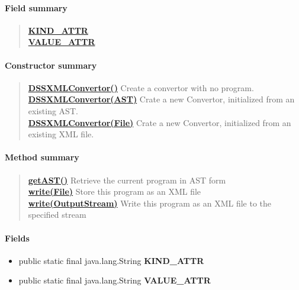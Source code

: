 {{{{\paragraph{Field summary}{
\begin{verse}
\hyperlink{org.openmrs.module.dssmodule.DSSXMLConvertor.KIND_ATTR}{{\bf KIND\_ATTR}} \\
\hyperlink{org.openmrs.module.dssmodule.DSSXMLConvertor.VALUE_ATTR}{{\bf VALUE\_ATTR}} \\
\end{verse}
}
\paragraph{Constructor summary}{
\begin{verse}
\hyperlink{org.openmrs.module.dssmodule.DSSXMLConvertor()}{{\bf DSSXMLConvertor()}} Create a convertor with no program.\\
\hyperlink{org.openmrs.module.dssmodule.DSSXMLConvertor(org.openmrs.module.dssmodule.ast.AST)}{{\bf DSSXMLConvertor(AST)}} Crate a new Convertor, initialized from an existing AST.\\
\hyperlink{org.openmrs.module.dssmodule.DSSXMLConvertor(java.io.File)}{{\bf DSSXMLConvertor(File)}} Crate a new Convertor, initialized from an existing XML file.\\
\end{verse}
}
\paragraph{Method summary}{
\begin{verse}
\hyperlink{org.openmrs.module.dssmodule.DSSXMLConvertor.getAST()}{{\bf getAST()}} Retrieve the current program in AST form\\
\hyperlink{org.openmrs.module.dssmodule.DSSXMLConvertor.write(java.io.File)}{{\bf write(File)}} Store this program as an XML file\\
\hyperlink{org.openmrs.module.dssmodule.DSSXMLConvertor.write(java.io.OutputStream)}{{\bf write(OutputStream)}} Write this program as an XML file to the specified stream\\
\end{verse}
}
\paragraph{Fields}{
\begin{itemize}
\item{
\label{org.openmrs.module.dssmodule.DSSXMLConvertor.KIND_ATTR}\hypertarget{org.openmrs.module.dssmodule.DSSXMLConvertor.KIND_ATTR}{public static final java.lang.String {\bf  KIND\_ATTR}}
}
\item{
\label{org.openmrs.module.dssmodule.DSSXMLConvertor.VALUE_ATTR}\hypertarget{org.openmrs.module.dssmodule.DSSXMLConvertor.VALUE_ATTR}{public static final java.lang.String {\bf  VALUE\_ATTR}}
}
\end{itemize}
}
}}}}
